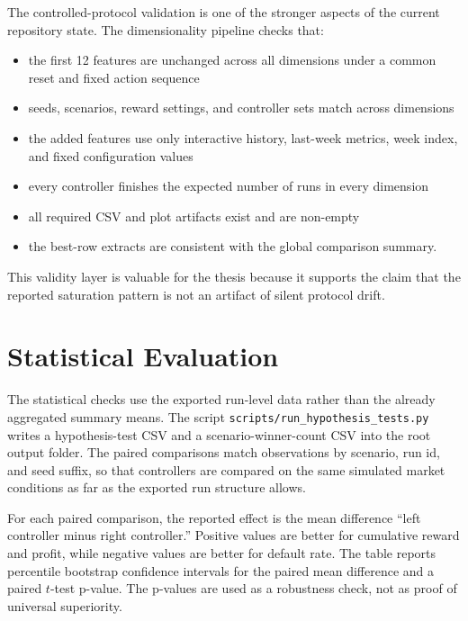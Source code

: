 \documentclass[12pt,a4paper]{article}
\begin{document}
The controlled-protocol validation is one of the stronger aspects of the current repository state. The dimensionality pipeline checks that:
\begin{itemize}[leftmargin=*]
    \item the first 12 features are unchanged across all dimensions under a common reset and fixed action sequence
    \item seeds, scenarios, reward settings, and controller sets match across dimensions
    \item the added features use only interactive history, last-week metrics, week index, and fixed configuration values
    \item every controller finishes the expected number of runs in every dimension
    \item all required CSV and plot artifacts exist and are non-empty
    \item the best-row extracts are consistent with the global comparison summary.
\end{itemize}

This validity layer is valuable for the thesis because it supports the claim that the reported saturation pattern is not an artifact of silent protocol drift.

\section{Statistical Evaluation}

The statistical checks use the exported run-level data rather than the already aggregated summary means. The script \texttt{scripts/run\_hypothesis\_tests.py} writes a hypothesis-test CSV and a scenario-winner-count CSV into the root output folder. The paired comparisons match observations by scenario, run id, and seed suffix, so that controllers are compared on the same simulated market conditions as far as the exported run structure allows.

For each paired comparison, the reported effect is the mean difference ``left controller minus right controller.'' Positive values are better for cumulative reward and profit, while negative values are better for default rate. The table reports percentile bootstrap confidence intervals for the paired mean difference and a paired $t$-test p-value. The p-values are used as a robustness check, not as proof of universal superiority.
\end{document}

